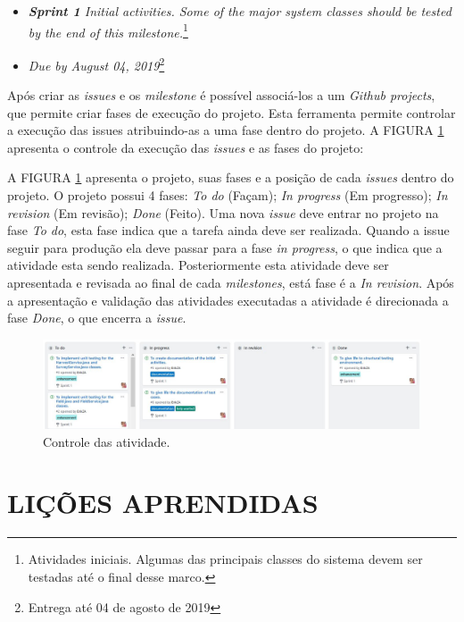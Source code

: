 \begin{itemize}
    \item[1]\textit{\textbf{Sprint 1} Initial activities. Some of the major system classes should be tested by the end of this milestone.}\footnote{Atividades iniciais. Algumas das principais classes do sistema devem ser testadas até o final desse marco.}
    \item \textit{Due by August 04, 2019}\footnote{ Entrega até 04 de agosto de 2019}
\end{itemize}{}

Após criar as \textit{issues} e os \textit{milestone} é possível associá-los a um \textit{Github projects}, que permite criar fases de execução do projeto. Esta ferramenta permite controlar a execução das issues atribuindo-as a uma fase dentro do projeto.  A FIGURA \ref{controleAtividades} apresenta o controle da execução das \textit{issues} e as fases do projeto:

A FIGURA \ref{controleAtividades} apresenta o projeto, suas fases e a posição de cada \textit{issues} dentro do projeto.   O projeto possui 4 fases: \textit{To do} (Façam); \textit{In progress} (Em progresso); \textit{In revision} (Em revisão); \textit{Done} (Feito). Uma nova \textit{issue} deve entrar no projeto na fase \textit{To do}, esta fase indica que a tarefa ainda deve ser realizada. Quando a issue seguir para produção ela deve passar para a fase \textit{in progress}, o que indica que a atividade esta sendo realizada. Posteriormente esta atividade deve ser apresentada e revisada ao final de cada \textit{milestones}, está fase é a \textit{In revision}. Após a apresentação e validação das atividades executadas a atividade é direcionada a fase \textit{Done}, o que encerra a \textit{issue}.
\begin{landscape}
\begin{figure}[H]
	\centering
	\includegraphics[scale=0.7]{dados/figuras/atividadesProjeto.JPG}
	\caption{Controle das atividade.}
	\label{controleAtividades}
\end{figure}
\end{landscape}



\section{LIÇÕES APRENDIDAS}


